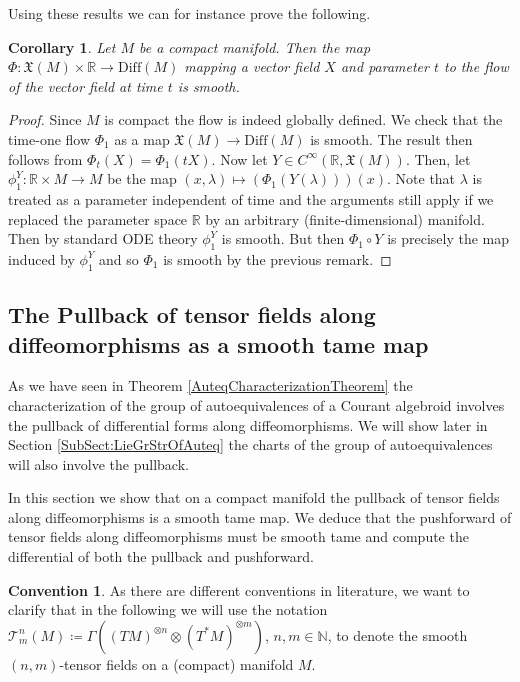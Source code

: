 \documentclass[12pt,a4paper]{article}
\theoremstyle{plain}
\newtheorem{corollary}[theorem]{Corollary}
\theoremstyle{definition}
\newtheorem{convention}[theorem]{Convention}
\newcommand{\R}{\mathbb{R}}
\newcommand{\N}{\mathbb{N}}
\newcommand{\tens}{\otimes}
\newcommand{\VFs}{\mathfrak{X}(M)}
\newcommand{\Diff}{\mathrm{Diff}(M)}
\newcommand{\tensf}[2]{\mathcal{T}^{#1}_{#2}(M)}
\begin{document}
Using these results we can for instance prove the following.
\begin{corollary}
\label{Cor:FlowSmooth}
    Let $M$ be a compact manifold. Then the map  $\Phi:\VFs\times \R\to \Diff$ mapping a vector field $X$ and parameter $t$ to the flow of the vector field at time $t$ is smooth.
\end{corollary}
\begin{proof}
    Since $M$ is compact the flow is indeed globally defined.
    We check that the time-one flow $\Phi_1$ as a map $\VFs\to \Diff$ is smooth. The result then follows from $\Phi_t(X)=\Phi_1(tX)$. Now let $Y\in C^\infty(\R,\VFs)$. Then, let $\phi^Y_1:\R\times M\to M$ be the map $(x,\lambda)\mapsto (\Phi_1(Y(\lambda)))(x)$. Note that $\lambda$ is treated as a parameter independent of time and the arguments still apply if we replaced the parameter space $\R$ by an arbitrary (finite-dimensional) manifold. Then by standard ODE theory $\phi^Y_1$ is smooth. But then $\Phi_1\circ Y$ is precisely the map induced by $\phi^Y_1$ and so $\Phi_1$ is smooth by the previous remark. 
\end{proof}




\subsection{The Pullback of tensor fields along diffeomorphisms as a smooth tame map}

As we have seen in Theorem \ref{AuteqCharacterizationTheorem} the characterization of the group of autoequivalences of a Courant algebroid involves the pullback of differential forms along diffeomorphisms. We will show later in Section \ref{SubSect:LieGrStrOfAuteq} the charts of the group of autoequivalences will also involve the pullback. 

In this section we show that on a compact manifold the pullback of tensor fields along diffeomorphisms is a smooth tame map. We deduce that the pushforward of tensor fields along diffeomorphisms must be smooth tame and compute the differential of both the pullback and pushforward.

\begin{convention}
\label{Conv:tensfields}
As there are different conventions in literature, we want to clarify that in the following we will use the notation $\tensf{n}{m}\coloneqq \Gamma((TM)^{\tens n}\tens(T^*M)^{\tens m})$, $n,m\in \N$, to denote the smooth $(n,m)$-tensor fields on a (compact) manifold $M$.
\end{convention}
\end{document}
